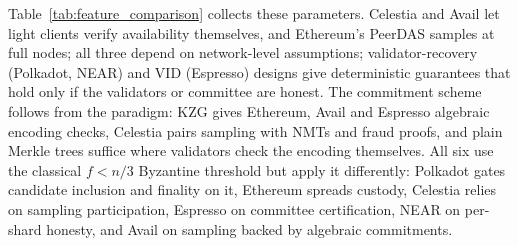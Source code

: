 Table~\ref{tab:feature_comparison} collects these parameters.
Celestia and Avail let light clients verify availability themselves, and Ethereum's PeerDAS samples at full nodes; all three depend on network-level assumptions; validator-recovery (Polkadot, NEAR) and VID (Espresso) designs give deterministic guarantees that hold only if the validators or committee are honest.
The commitment scheme follows from the paradigm: KZG gives Ethereum, Avail and Espresso algebraic encoding checks, Celestia pairs sampling with NMTs and fraud proofs, and plain Merkle trees suffice where validators check the encoding themselves.
All six use the classical $f < n/3$ Byzantine threshold but apply it differently: Polkadot gates candidate inclusion and finality on it, Ethereum spreads custody, Celestia relies on sampling participation, Espresso on committee certification, NEAR on per-shard honesty, and Avail on sampling backed by algebraic commitments.
